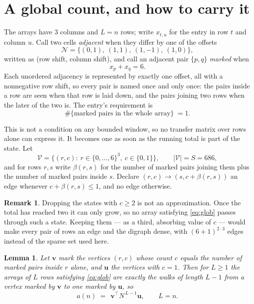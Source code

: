 \documentclass[11pt,a4paper]{article}
\theoremstyle{plain}
\newtheorem{lemma}[theorem]{Lemma}
\theoremstyle{definition}
\newtheorem{remark}[theorem]{Remark}
\begin{document}
\section{A global count, and how to carry it}

The arrays have $3$ columns and $L=n$ rows; write $x_{t,u}$ for the entry in
row $t$ and column $u$. Call two cells \emph{adjacent} when they differ by one of the
offsets
\[
\mathcal N=\{(0,1),\ (1,1),\ (1,-1),\ (1,0)\},
\]
written as (row shift, column shift), and call an adjacent pair $\{p,q\}$
\emph{marked} when
\[
x_{p}+x_{q}=6 .
\]
Each unordered adjacency is represented by exactly one offset, all with a nonnegative row
shift, so every pair is named once and only once: the pairs inside a row are seen when
that row is laid down, and the pairs joining two rows when the later of the two is. The
entry's requirement is
\begin{equation}\label{eq:glob}
\#\{\text{marked pairs in the whole array}\}\;=1.
\end{equation}

This is not a condition on any bounded window, so no transfer matrix over rows alone can
express it. It becomes one as soon as the running total is part of the state. Let
\[
\mathcal V=\bigl\{(r,c):\ r\in\{0,\dots,6\}^{3},\ c\in\{0,1\}\bigr\},
\qquad |\mathcal V|=S=686,
\]
and for rows $r,s$ write $\beta(r,s)$ for the number of marked pairs joining them plus the
number of marked pairs inside $s$. Declare $(r,c)\to(s,c+\beta(r,s))$ an edge whenever
$c+\beta(r,s)\le1$, and no edge otherwise.

\begin{remark}
Dropping the states with $c\ge2$ is not an approximation. Once the total has reached two it
can only grow, so no array satisfying \eqref{eq:glob} passes through such a state. Keeping
them --- as a third, absorbing value of $c$ --- would make every pair of rows an edge and
the digraph dense, with $(6+1)^{2\cdot3}$ edges instead of the sparse set used here.
\end{remark}

\begin{lemma}\label{lem:walk}
Let $\mathbf{v}$ mark the vertices $(r,c)$ whose count $c$ equals the number of marked pairs
inside $r$ alone, and $\mathbf{u}$ the vertices with $c=1$. Then for $L\ge1$ the arrays
of $L$ rows satisfying \eqref{eq:glob} are exactly the walks of length $L-1$ from a
vertex marked by $\mathbf{v}$ to one marked by $\mathbf{u}$, so
\[
a(n)\;=\;\,\mathbf{v}^{\!\top}N^{\,L-1}\mathbf{u},\qquad L=n .
\]
\end{lemma}
\end{document}
